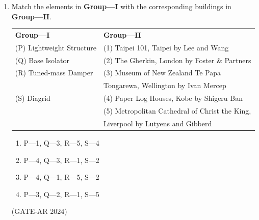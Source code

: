 \documentclass[a4paper,10pt]{article}
\begin{document}
\begin{enumerate}
    \item Match the elements in \textbf{Group—I} with the corresponding buildings in \textbf{Group—II}. \\
    \begin{tabular}{ l l }
    \textbf{Group—I} & \textbf{Group—II} \\
    (P) Lightweight Structure & (1) Taipei 101, Taipei by Lee and Wang \\
    (Q) Base Isolator & (2) The Gherkin, London by Foster \& Partners \\
    (R) Tuned-mass Damper & (3) Museum of New Zealand Te Papa \\
    & Tongarewa, Wellington by Ivan Mercep \\
    (S) Diagrid & (4) Paper Log Houses, Kobe by Shigeru Ban \\
    & (5) Metropolitan Cathedral of Christ the King, \\
    & Liverpool by Lutyens and Gibberd \\
    \end{tabular}
    \begin{multicols}{2}
    \begin{enumerate}
        \item P—1, Q—3, R—5, S—4
        \item P—4, Q—3, R—1, S—2
        \item P—4, Q—1, R—5, S—2
        \item P—3, Q—2, R—1, S—5
    \end{enumerate}
    \end{multicols}
    \hfill (GATE-AR 2024)


\end{enumerate}
\end{document}
